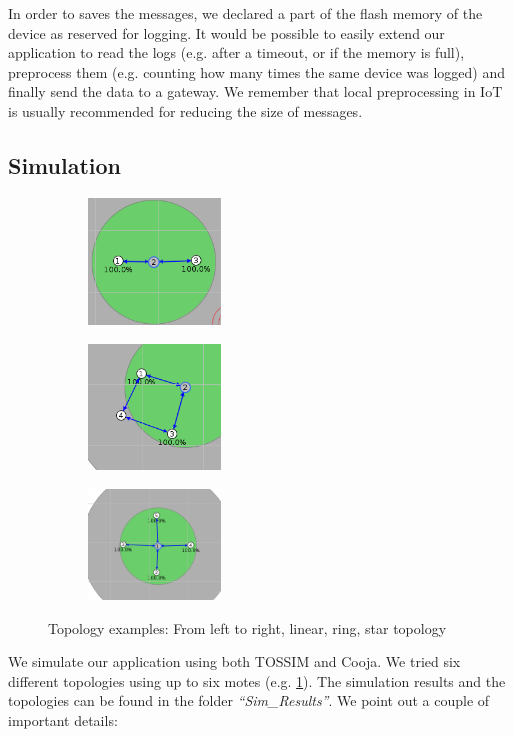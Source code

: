 \documentclass[12pt]{article}
\begin{document}
In order to saves the messages, we declared a part of the flash memory of the device as reserved for logging. It would be possible to easily extend our application to read the logs (e.g. after a timeout, or if the memory is full), preprocess them (e.g. counting how many times the same device was logged) and finally send the data to a gateway. We remember that local preprocessing in IoT is usually recommended for reducing the size of messages.
\subsection{Simulation}
\begin{figure}[h]
	\begin{subfigure}{0.32\textwidth}
		\includegraphics[width=100pt, left]{linear-topology.png}
	\end{subfigure} 
	\begin{subfigure}{0.32\textwidth}
		\includegraphics[width=100pt, center]{ring-topology.png}
	\end{subfigure}
	\begin{subfigure}{0.32\textwidth}
		\includegraphics[width=100pt, right]{star-topology.png}
	\end{subfigure}
	\caption{Topology examples: From left to right, linear, ring, star topology}
	\label{fig:topologies}
\end{figure} 
We simulate our application using both TOSSIM and Cooja. We tried six different topologies using up to six motes (e.g. \ref{fig:topologies}). The simulation results and the topologies can be found in the folder \textit{``Sim\_Results''}. We point out a couple of important details:
\end{document}
